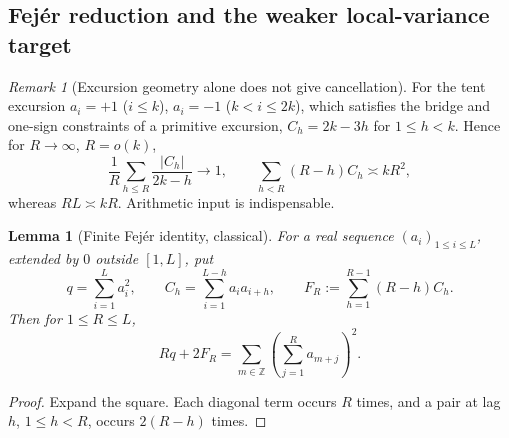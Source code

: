 \documentclass[11pt,reqno]{amsart}
\numberwithin{equation}{section}
\theoremstyle{plain}
\newtheorem{lemma}[theorem]{Lemma}
\theoremstyle{definition}
\theoremstyle{remark}
\newtheorem{remark}[theorem]{Remark}
\begin{document}
\subsection{Fej\'er reduction and the weaker local-variance target}

\begin{remark}[Excursion geometry alone does not give cancellation]
\label{rem:tent-chowla}
For the tent excursion $a_i=+1$ ($i\le k$), $a_i=-1$ ($k<i\le2k$), which
satisfies the bridge and one-sign constraints of a primitive excursion,
$C_h=2k-3h$ for $1\le h<k$. Hence for $R\to\infty$, $R=o(k)$,
\begin{equation}
\frac1R\sum_{h\le R}\frac{|C_h|}{2k-h}\longrightarrow1,
\qquad
\sum_{h<R}(R-h)C_h\asymp kR^2,
\end{equation}
whereas $RL\asymp kR$. Arithmetic input is indispensable.
\end{remark}

\begin{lemma}[Finite Fej\'er identity, classical]
\label{lem:fejer}
For a real sequence $(a_i)_{1\le i\le L}$, extended by $0$ outside
$[1,L]$, put
\begin{equation}
q=\sum_{i=1}^La_i^2,
\qquad
C_h=\sum_{i=1}^{L-h}a_ia_{i+h},
\qquad
F_R:=\sum_{h=1}^{R-1}(R-h)C_h.
\end{equation}
Then for $1\le R\le L$,
\begin{equation}
\label{eq:fejer}
Rq+2F_R
=\sum_{m\in\mathbb Z}\left(\sum_{j=1}^{R}a_{m+j}\right)^2.
\end{equation}
\end{lemma}

\begin{proof}
Expand the square. Each diagonal term occurs $R$ times, and a pair at lag
$h$, $1\le h<R$, occurs $2(R-h)$ times.
\end{proof}
\end{document}
